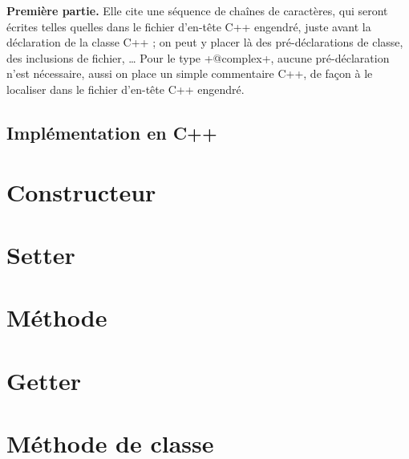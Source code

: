 \textbf{Première partie.} Elle cite une séquence de chaînes de caractères, qui seront écrites telles quelles dans le fichier d'en-tête C++ engendré, juste avant la déclaration de la classe C++ ; on peut y placer là des pré-déclarations de classe, des inclusions de fichier, … Pour le type \ggsq+@complex+, aucune pré-déclaration n'est nécessaire, aussi on place un simple commentaire C++, de façon à le localiser dans le fichier d'en-tête C++ engendré.

\subsection{Implémentation en C++}






\section{Constructeur}


\section{Setter}


\section{Méthode}


\section{Getter}


\section{Méthode de classe}

